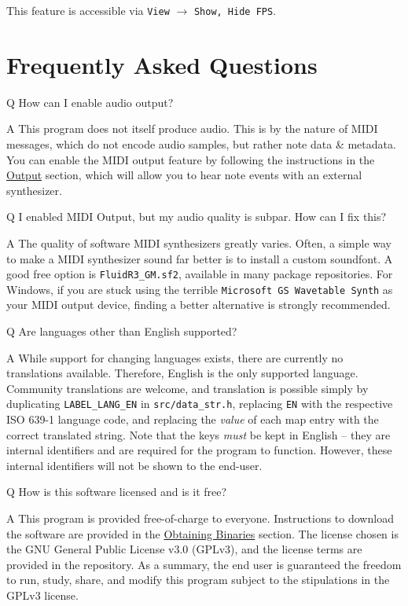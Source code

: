\documentclass[english]{article}
\newcommand\faqQ[1]{%
  \leavevmode\par
  \noindent
{\hspace{4pt}\Large Q} \raisebox{0.1em}{--} {\large #1}\par \vspace{-0.5em}}
\newcommand\faqA[2][]{%
  \leavevmode\par\noindent
  {\leftskip30pt
  {\large A} \raisebox{0.05em}{--} \textbf{#1}#2\par \vspace{-0.25em}}}
\providecommand{\mi}[1]{\texttt{#1}}
\begin{document}
This feature is accessible via 
\mi{View} $\rightarrow$ \mi{{Show, Hide} FPS}.

\section{Frequently Asked Questions}

\faqQ{How can I enable audio output?}

\faqA{This program does not itself produce audio. This is by the nature of MIDI messages, which do not encode audio samples,
but rather note data \& metadata. You can enable the MIDI output feature by following the instructions in the 
\textcolor{lcol}{\hyperref[subsec:output]{Output}} section, which will allow you to hear note events with an external
synthesizer.}

\faqQ{I enabled MIDI Output, but my audio quality is subpar. How can I fix this?}

\faqA{The quality of software MIDI synthesizers greatly varies. Often, a simple way to make a MIDI synthesizer sound
far better is to install a custom soundfont. A good free option is \mi{FluidR3_GM.sf2}, available in many
package repositories. For Windows, if you are stuck using the terrible \mi{Microsoft GS Wavetable Synth} as your
MIDI output device, finding a better alternative is strongly recommended.}

\faqQ{Are languages other than English supported?}

\faqA{While support for changing languages exists, there are currently no translations available. Therefore,
English is the only supported language. Community translations are welcome, and translation is possible simply by
duplicating \mi{LABEL_LANG_EN} in \mi{src/data_str.h}, replacing \mi{EN} with the respective ISO 639-1 language code,
and replacing the \textit{value} of each map entry with the correct translated string. Note that the keys \textit{must} be
kept in English -- they are internal identifiers and are required for the program to function. However, these internal
identifiers will not be shown to the end-user.}

\faqQ{How is this software licensed and is it free?}

\faqA{This program is provided free-of-charge to everyone. Instructions to download the software are provided in the
\textcolor{lcol}{\hyperref[sec:obtain]{Obtaining Binaries}} section. The license chosen is the GNU General 
Public License v3.0 (GPLv3), and the license terms are provided in the repository. As a summary, the end user is 
guaranteed the freedom to run, study, share, and modify this program subject to the stipulations in the GPLv3 license.}
\end{document}
